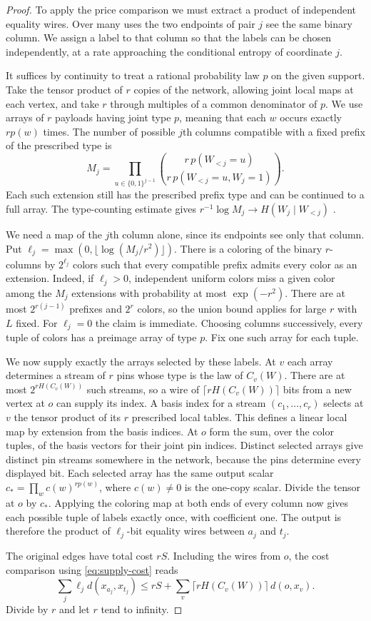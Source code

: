 \begin{proof}
To apply the price comparison we must extract a product of independent
equality wires. Over many uses the two endpoints of pair $j$ see the
same binary column. We assign a label to that column so that the labels
can be chosen independently, at a rate approaching the conditional
entropy of coordinate $j$.

It suffices by continuity to treat a rational probability law $p$ on
the given support. Take the tensor product of $r$ copies of the network, allowing joint
local maps at each vertex, and take $r$ through multiples of a common
denominator of $p$. We use arrays of $r$ payloads having joint type $p$,
meaning that each $w$ occurs exactly $rp(w)$ times. The number of
possible $j$th columns compatible with a fixed prefix of the prescribed
type is
\[
 M_j=\prod_{u\in\{0,1\}^{j-1}}
       \binom{r\,p(W_{<j}=u)}{r\,p(W_{<j}=u, W_j=1)}.
\]
Each such extension still has the prescribed prefix type and can be
continued to a full array. The type-counting estimate gives
$r^{-1}\log M_j\to H(W_j\mid W_{<j})$ \cite[Theorem~11.1.3]{CT}.

We need a map of the $j$th column alone, since its endpoints see only
that column. Put $\ell_j=\max(0,\lfloor\log(M_j/r^2)\rfloor)$.
There is a coloring of the binary $r$-columns by $2^{\ell_j}$ colors
such that every compatible prefix admits every color as an extension.
Indeed, if $\ell_j>0$, independent uniform colors miss a given color
among the $M_j$ extensions with probability at most $\exp(-r^2)$.
There are at most $2^{r(j-1)}$ prefixes and $2^r$ colors, so the union
bound applies for large $r$ with $L$ fixed. For $\ell_j=0$ the claim
is immediate. Choosing columns successively, every tuple of colors
has a preimage array of type $p$. Fix one such array for each tuple.

We now supply exactly the arrays selected by these labels. At $v$
each array determines a stream of $r$ pins whose type is the law
of $C_v(W)$. There are at most $2^{rH(C_v(W))}$ such streams, so a wire
of $\lceil rH(C_v(W))\rceil$ bits from a new vertex at $o$ can supply
its index. A basis index for a stream $(c_1,\ldots,c_r)$ selects at $v$
the tensor product of its $r$ prescribed local tables. This defines a
linear local map by extension from the basis indices. At $o$ form the sum, over the color tuples, of the basis vectors for
their joint pin indices. Distinct selected arrays give distinct pin
streams somewhere in the network, because the pins determine every
displayed bit. Each selected array has the same output scalar
$c_*=\prod_w c(w)^{rp(w)}$, where $c(w)\ne0$ is the one-copy scalar.
Divide the tensor at $o$ by $c_*$. Applying the coloring map at both
ends of every column now gives each possible tuple of labels exactly
once, with coefficient one. The output is therefore the product of
$\ell_j$-bit equality wires between $a_j$ and $t_j$.

The original edges have total cost $rS$. Including the wires from $o$,
the cost comparison using \eqref{eq:supply-cost} reads
\[
  \sum_j \ell_j d(x_{a_j},x_{t_j})
     \le rS+\sum_v \lceil rH(C_v(W))\rceil\,d(o,x_v).
\]
Divide by $r$ and let $r$ tend to infinity.
\end{proof}



